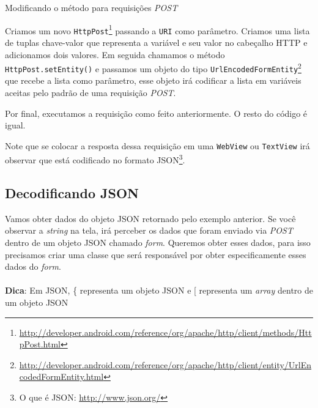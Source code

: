 \documentclass[a4paper,12pt,brazil,oneside]{book}
\begin{document}
\begin{singlespace}
		\begin{listing}[H]
		\inputminted[linenos=true,fontsize=\small,frame=lines, framesep=2mm, tabsize=2,numbersep=5pt]{java}{src/api/comm/httppost.java}
		\caption{Modificando o método para requisições \emph{POST}}
		\label{code:httppost}
		\end{listing} 

		Criamos um novo \texttt{HttpPost}\footnote{\href{http://developer.android.com/reference/org/apache/http/client/methods/HttpPost.html}{http://developer.android.com/reference/org/apache/http/client/methods/HttpPost.html}} passando a \texttt{URI} como parâmetro. Criamos uma lista de tuplas chave-valor que representa a variável e seu valor no cabeçalho HTTP e adicionamos dois valores. Em seguida chamamos o método \texttt{HttpPost.setEntity()} e passamos um objeto do tipo \texttt{UrlEncodedFormEntity}\footnote{\href{http://developer.android.com/reference/org/apache/http/client/entity/UrlEncodedFormEntity.html}{http://developer.android.com/reference/org/apache/http/client/entity/UrlEncodedFormEntity.html}} que recebe a lista como parâmetro, esse objeto irá codificar a lista em variáveis aceitas pelo padrão de uma requisição \emph{POST}.

		Por final, executamos a requisição como feito anteriormente. O resto do código é igual.

 		Note que se colocar a resposta dessa requisição em uma \texttt{WebView} ou \texttt{TextView} irá observar que está codificado no formato JSON\footnote{O que é JSON: \href{http://www.json.org/}{http://www.json.org/}}. 

		\subsection{Decodificando JSON}
		
		Vamos obter dados do objeto JSON retornado pelo exemplo anterior. Se você observar a \emph{string} na tela, irá perceber os dados que foram enviado via \emph{POST} dentro de um objeto JSON chamado \emph{form}. Queremos obter esses dados, para isso precisamos criar uma classe que será responsável por obter especificamente esses dados do \emph{form}.
		
\begin{framed}
\paragraph{}\textbf{Dica}: Em JSON, \{ representa um objeto JSON e [ representa um \emph{array} dentro de um objeto JSON
\textit{}
\end{framed}


\end{singlespace}
\end{document}
